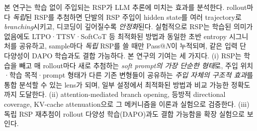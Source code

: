 본 연구는 학습 없이 주입되는 RSP가 LLM 추론에 미치는 효과를 분석한다. rollout마다 \emph{독립}된 RSP를 추첨하면 단발의 RSP 주입이 hidden state를 여러 trajectory로 \textit{branching}시키고, 디코딩이 깊어질수록 \textit{안정화}된다. 실험적으로 RSP는 학습된 의미가 없음에도 LTPO·TTSV·SoftCoT 등 최적화된 방법과 동일한 초반 entropy 시그니처를 공유하고, sample마다 \emph{독립} RSP를 쓸 때만 Pass@$N$이 누적되며, 같은 입력 단 다양성이 DAPO \citep{yu2025dapo} 학습과도 결합 가능하다. 본 연구의 기여는 세 가지다. (i) RSP는 학습을 빼고 매 rollout마다 새로 추첨하는 \emph{soft prompt의 가장 단순한 형태}로, 주입 위치·학습 목적·prompt 형태가 다른 기존 변형들이 공유하는 \emph{주입 자체의 구조적 효과}를 통합 분석할 수 있는 lens가 되며, 일부 설정에서 최적화된 방법과 비교 가능한 정확도까지 도달한다. (ii) attention-mediated branch opening, 등방적 directional coverage, KV-cache attenuation으로 그 메커니즘을 이론과 실험으로 검증한다. (iii) 독립 RSP 재추첨이 rollout 다양성 학습(DAPO)과도 결합 가능함을 확장 실험으로 보인다.

